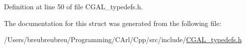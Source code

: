 Definition at line 50 of file C\+G\+A\+L\+\_\+typedefs.\+h.



The documentation for this struct was generated from the following file\+:\begin{DoxyCompactItemize}
\item 
/\+Users/breubreubreu/\+Programming/\+C\+Arl/\+Cpp/src/include/\hyperlink{_c_g_a_l__typedefs_8h}{C\+G\+A\+L\+\_\+typedefs.\+h}\end{DoxyCompactItemize}
